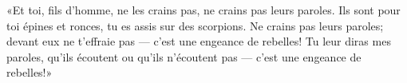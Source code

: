 «Et toi, fils d’homme, ne les crains pas, ne crains pas leurs paroles.
Ils sont pour toi épines et ronces, tu es assis sur des scorpions.
Ne crains pas leurs paroles; devant eux ne t’effraie pas
	--- c’est une engeance de rebelles!
Tu leur diras mes paroles, qu’ils écoutent ou qu’ils n’écoutent pas
	--- c’est une engeance de rebelles!»
